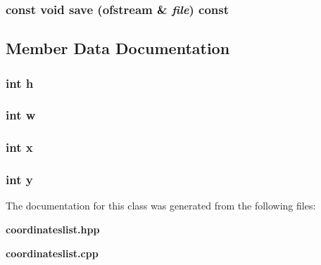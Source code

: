 \subsubsection{\setlength{\rightskip}{0pt plus 5cm}const void save (ofstream \& {\em file}) const}\label{classCoordinate_a5}




\subsection{Member Data Documentation}
\subsubsection{\setlength{\rightskip}{0pt plus 5cm}int {\bf h}}\label{classCoordinate_o3}


\subsubsection{\setlength{\rightskip}{0pt plus 5cm}int {\bf w}}\label{classCoordinate_o2}


\subsubsection{\setlength{\rightskip}{0pt plus 5cm}int {\bf x}}\label{classCoordinate_o0}


\subsubsection{\setlength{\rightskip}{0pt plus 5cm}int {\bf y}}\label{classCoordinate_o1}




The documentation for this class was generated from the following files:\begin{CompactItemize}
\item 
{\bf coordinateslist.hpp}\item 
{\bf coordinateslist.cpp}\end{CompactItemize}

